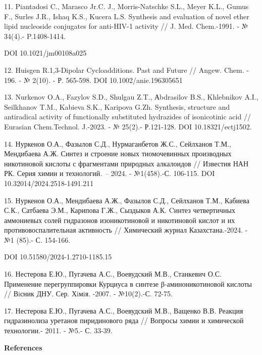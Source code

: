 \begin{noparindent}
11. Piantadosi C., Marasco Jr.C. J., Morris-Natschke S.L., Meyer K.L.,
Gumus F., Surles J.R., Ishaq K.S., Kucera L.S. Synthesis and evaluation
of novel ether lipid nucleoside conjugates for anti-HIV-1 activity // J.
Med. Chem.-1991. - № 34(4).- P.1408-1414.

DOI 10.1021/jm00108a025

12. Huisgen R.1,3-Dipolar Cycloadditions. Past and Future // Angew.
Chem. - 196. - № 2(10). - Р. 565-598. DOI 10.1002/anie.196305651

13. Nurkenov O.A., Fazylov S.D., Shulgau Z.T., Аbdrasilov B.S.,
Khlebnikov A.I., Seilkhanov T.M., Kabieva S.K., Karipova G.Zh.
Synthesis, structure and antiradical activity of functionally
substituted hydrazides of isonicotinic acid // Eurasian Chem.Technol.
J.-2023. - № 25(2).- Р.121-128. DOI 10.18321/ectj1502.

14. Нуркенов О.А., Фазылов С.Д., Нурмаганбетов Ж.С., Сейлханов Т.М.,
Мендибаева А.Ж. Синтез и строение новых тиомочевинных производных
никотиновой кислоты с фрагментами природных алкалоидов // Известия НАН
РК. Серия химии и технологий\emph{. --} 2024. - №1(458).-С. 106-115. DOI
10.32014/2024.2518-1491.211

15. Нуркенов О.А., Мендибаева А.Ж., Фазылов С.Д., Сейлханов Т.М.,
Кабиева С.К., Сатбаева Э.М., Карипова Г.Ж., Сыздыков А.К. Cинтез
четвертичных аммониевых солей гидразонов изоникотиновой и никотиновой
кислот и их противовоспалительная активность // Химический журнал
Казахстана.-2024. - №1 (85).- С. 154-166.

DOI 10.51580/2024-1.2710-1185.15

16. Нестерова Е.Ю., Пугачева А.С., Воевудский М.В., Станкевич О.С.
Применение перегруппировки Курциуса в синтезе β-аминоникотиновой кислоты
// Вiсник ДНУ. Сер. Хiмiя. -2007. - №10(2).-С. 72-75.

17. Нестерова Е.Ю., Пугачева А.С., Воевудский М.В., Ващенко В.В. Реакция
гидразинолиза уретанов пиридинового ряда // Вопросы химии и химической
технологии.- 2011. - №5.- С. 33-39.
\end{noparindent}

\begin{center}
{\bfseries References}
\end{center}

